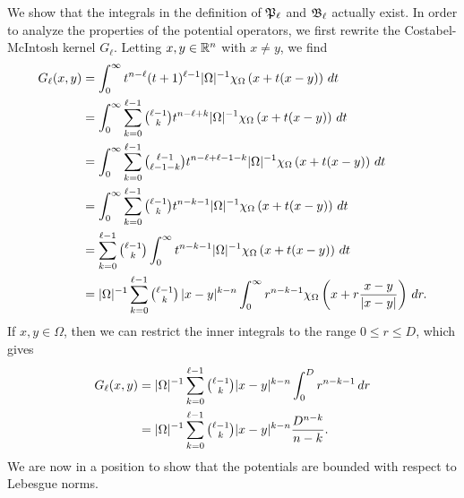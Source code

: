 \documentclass[10pt,letterpaper]{article}
\begin{document}
We show that the integrals in the definition of ${\mathfrak P}_{\ell}$ and ${\mathfrak B}_{\ell}$ actually exist. 
In order to analyze the properties of the potential operators,
we first rewrite the Costabel-McIntosh kernel $G_{\ell}$.
Letting $x,y \in {\mathbb R}^n$ with $x \neq y$, we find 
\begin{align*}
    G_{\ell}(x,y) 
    &= 
    \int_{0}^{\infty} t^{n-\ell} (t+1)^{\ell-1} |\Omega|^{-1} \chi_{\Omega} \left( x+t(x-y) \right)\,dt
    \\
    &= 
    \int_{0}^{\infty} \sum_{k=0}^{\ell-1} \tbinom{\ell-1}{k} t^{n-\ell+k} |\Omega|^{-1} \chi_{\Omega} \left( x+t(x-y) \right)\,dt
    \\
    &= 
    \int_{0}^{\infty} \sum_{k=0}^{\ell-1} \tbinom{\ell-1}{\ell-1-k} t^{n-\ell+\ell-1-k} |\Omega|^{-1} \chi_{\Omega} \left( x+t(x-y) \right)\,dt
    \\
    &= 
    \int_{0}^{\infty} \sum_{k=0}^{\ell-1} \tbinom{\ell-1}{k} t^{n-k-1} |\Omega|^{-1} \chi_{\Omega} \left( x+t(x-y) \right)\,dt
    \\
    &= 
    \sum_{k=0}^{\ell-1} \tbinom{\ell-1}{k} \int_{0}^{\infty} t^{n-k-1} |\Omega|^{-1} \chi_{\Omega}\left( x+t(x-y) \right)\,dt 
    \\
    &= 
    |\Omega|^{-1} \sum_{k=0}^{\ell-1} \tbinom{\ell-1}{k} \, |x-y|^{k-n} \int_{0}^{\infty} r^{n-k-1} \chi_{\Omega}\left(x+r\frac{x-y}{|x-y|}\right)\,dr
    .
\end{align*}
If $x, y \in \Omega$, then we can restrict the inner integrals to the range $0 \leq r \leq D$, which gives 
\begin{align*}
    G_{\ell}(x,y) 
    &= 
    |\Omega|^{-1} \sum_{k=0}^{\ell-1}\tbinom{\ell-1}{k} |x-y|^{k-n} \int_{0}^{D} r^{n-k-1} \,dr 
    \\
    &= 
    |\Omega|^{-1} \sum_{k=0}^{\ell-1}\tbinom{\ell-1}{k} |x-y|^{k-n} \frac{ D^{n-k} }{n-k}.
\end{align*}
We are now in a position to show that the potentials are bounded with respect to Lebesgue norms. 
\end{document}

